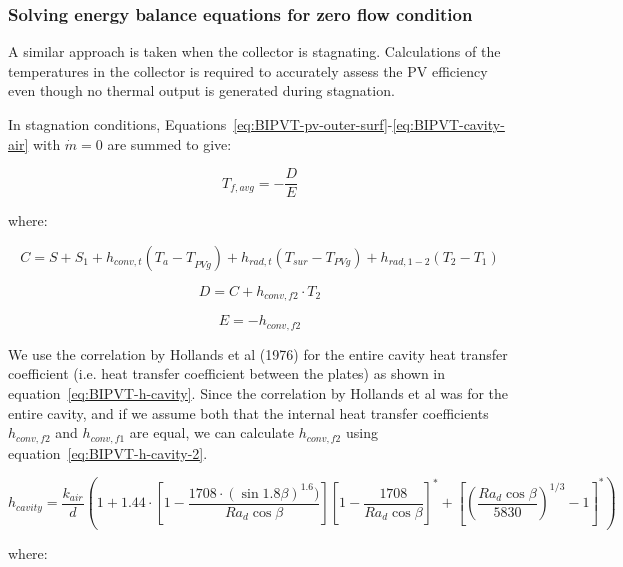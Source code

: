 \subsubsection{Solving energy balance equations for zero flow condition}\label{BIPVT-solving-zero-flow}

A similar approach is taken when the collector is stagnating. Calculations of the temperatures in the collector is required to accurately assess the PV efficiency even though no thermal output is generated during stagnation.

In stagnation conditions, Equations~\ref{eq:BIPVT-pv-outer-surf}-\ref{eq:BIPVT-cavity-air} with \(\dot{m}=0\) are summed to give:

\begin{equation}
T_{f,avg}=-\frac{D}{E}
\label{eq:BIPVT-Tfavg}
\end{equation}

where:

\begin{equation}
C=S+S_1+h_{conv,t}\left({T_a-T}_{PVg}\right)+h_{rad,t}\left(T_{sur}-T_{PVg}\right)+h_{rad,1-2}\left(T_2-T_1\right)
\label{eq:BIPVT-C}
\end{equation}

\begin{equation}
D=C+h_{conv,f2}\cdot T_2
\label{eq:BIPVT-D}
\end{equation}

\begin{equation}
E=-h_{conv,f2}
\label{eq:BIPVT-E}
\end{equation}

We use the correlation by Hollands et al (1976) for the entire cavity heat transfer coefficient (i.e. heat transfer coefficient between the plates) as shown in equation~\ref{eq:BIPVT-h-cavity}. Since the correlation by Hollands et al was for the entire cavity, and if we assume both that the internal heat transfer coefficients \(h_{conv,f2}\) and \(h_{conv,f1}\) are equal, we can calculate \(h_{conv,f2}\) using equation~\ref{eq:BIPVT-h-cavity-2}.

\begin{equation}
h_{cavity} = \frac{k_{air}}{d}\left(1+1.44\cdot\left[1-\frac{1708\cdot\left(\sin 1.8\beta\right)^{1.6})}{Ra_{d}\cos \beta}\right]\left[1-\frac{1708}{Ra_{d}\cos \beta} \right]^{*}+\left[\left(\frac{Ra_{d}\cos\beta}{5830}\right)^{1/3}-1\right]^{*} \right)
\label{eq:BIPVT-h-cavity}
\end{equation}

where:




